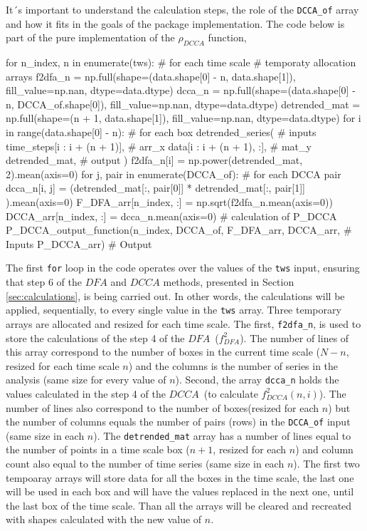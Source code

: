 \documentclass[article]{jss}
\begin{document}
It´s important to understand the calculation steps, the role of the \verb"DCCA_of" array and how it fits in the goals of the package implementation. The code below is part of the pure  implementation of the $\rho_{DCCA}$ function, 

\begin{Code}
for n_index, n  in enumerate(tws): # for each time scale
  # temporaty allocation arrays
  f2dfa_n = np.full(shape=(data.shape[0] - n, data.shape[1]),
  fill_value=np.nan, dtype=data.dtype)
  dcca_n = np.full(shape=(data.shape[0] - n, DCCA_of.shape[0]), 
  fill_value=np.nan, dtype=data.dtype)
  detrended_mat = np.full(shape=(n + 1, data.shape[1]), 
  fill_value=np.nan, dtype=data.dtype)
  for i in range(data.shape[0] - n): # for each box
      detrended_series( # inputs
                        time_steps[i : i + (n + 1)],  # arr_x
                        data[i : i + (n + 1), :],  # mat_y
                         detrended_mat,  # output
                      )
      f2dfa_n[i] = np.power(detrended_mat, 2).mean(axis=0)
      for j, pair in enumerate(DCCA_of): # for each DCCA pair
          dcca_n[i, j] = (detrended_mat[:, pair[0]] * detrended_mat[:, pair[1]]
                         ).mean(axis=0)
  F_DFA_arr[n_index, :] = np.sqrt(f2dfa_n.mean(axis=0))
  DCCA_arr[n_index, :] = dcca_n.mean(axis=0)
  # calculation of P_DCCA
  P_DCCA_output_function(n_index, DCCA_of, F_DFA_arr, DCCA_arr, # Inputs
  P_DCCA_arr) # Output
\end{Code}

The first \verb"for" loop in the code operates over the values of the \verb"tws" input, ensuring that step 6 of the $DFA$ and $DCCA$ methods, presented in Section \ref{sec:calculations}, is being carried out. In other words, the calculations will be applied, sequentially, to every single value in the \verb"tws" array. Three temporary arrays are allocated and resized for each time scale. The first, \verb"f2dfa_n", is used to store the calculations of the step 4 of the $DFA$~($f_{DFA}^{2}$). The number of lines of this array correspond to the number of boxes in the current time scale ($N - n$, resized for each time scale $n$) and the columns is the number of series in the analysis (same size for every value of $n$). Second, the array  \verb"dcca_n" holds the values calculated in the step 4 of the $DCCA$~(to calculate $f_{DCCA}^{2}(n, i)$). The number of lines also correspond to the number of boxes(resized for each $n$) but the number of columns equals the number of pairs (rows) in the \verb"DCCA_of" input (same size in each $n$). The \verb"detrended_mat" array has a number of lines equal to the number of points in a time scale box ($n +1$, resized for each $n$) and column count also equal to the number of time series (same size in each $n$). The first two tempoaray arrays will store data for all the boxes in the time scale, the last one will be used in each box and will have the values replaced in the next one, until the last box of the time scale. Than all the arrays will be cleared and recreated with shapes calculated with the new value of $n$.
\end{document}
